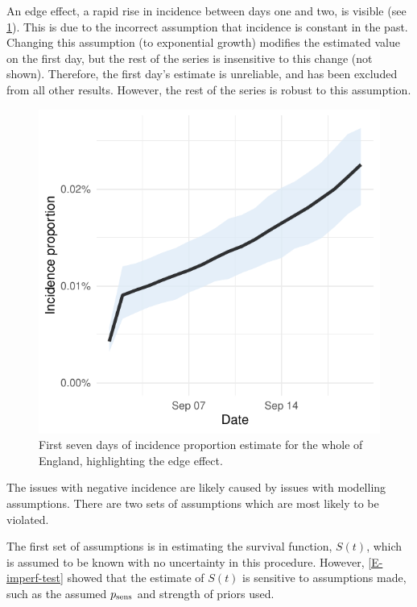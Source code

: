\documentclass[thesis.tex]{subfiles}
\begin{document}
An edge effect, a rapid rise in incidence between days one and two, is visible (see \cref{transmission:fig:backcalc-start-effect}).
This is due to the incorrect assumption that incidence is constant in the past.
Changing this assumption (\eg to exponential growth) modifies the estimated value on the first day, but the rest of the series is insensitive to this change (not shown).
Therefore, the first day's estimate is unreliable, and has been excluded from all other results.
However, the rest of the series is robust to this assumption.
\begin{figure}
    \centering \includegraphics{transmission/backcalc-start-effect}
    \caption[Edge effects in backcalculation method]{%
        First seven days of incidence proportion estimate for the whole of England, highlighting the edge effect.
    }
    \label{transmission:fig:backcalc-start-effect}
\end{figure}

The issues with negative incidence are likely caused by issues with modelling assumptions.
There are two sets of assumptions which are most likely to be violated.

The first set of assumptions is in estimating the survival function, $S(t)$, which is assumed to be known with no uncertainty in this procedure.
However, \cref{E-imperf-test} showed that the estimate of $S(t)$ is sensitive to assumptions made, such as the assumed $p_\text{sens}$ and strength of priors used.
\end{document}
